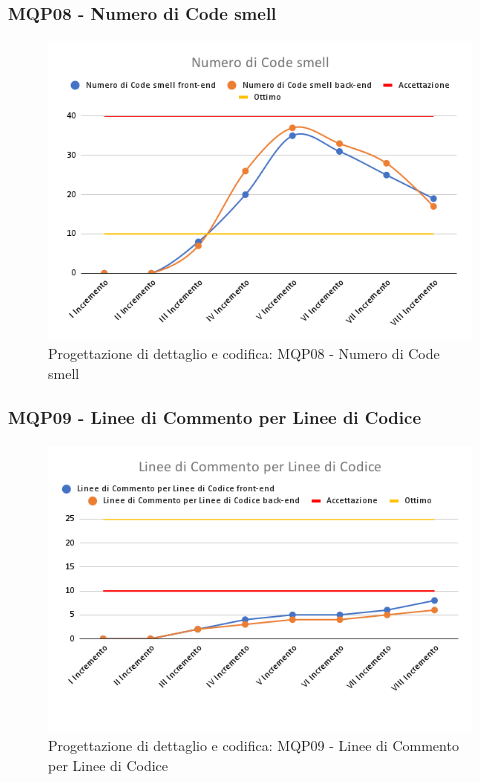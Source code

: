 \subsubsection{MQP08 - Numero di Code smell}
\begin{figure}[H]
    \centering
    \includegraphics[scale=0.50]{Sezioni/images/pb_prodotto/Numero_di_Code_smell.png}
    \caption{Progettazione di dettaglio e codifica: MQP08 - Numero di Code smell}
\end{figure}
\subsubsection{MQP09 - Linee di Commento per Linee di Codice}
\begin{figure}[H]
    \centering
    \includegraphics[scale=0.50]{Sezioni/images/pb_prodotto/Linee_di_Commento_per_Linee_di_Codice.png}
    \caption{Progettazione di dettaglio e codifica: MQP09 - Linee di Commento per Linee di Codice}
\end{figure}
